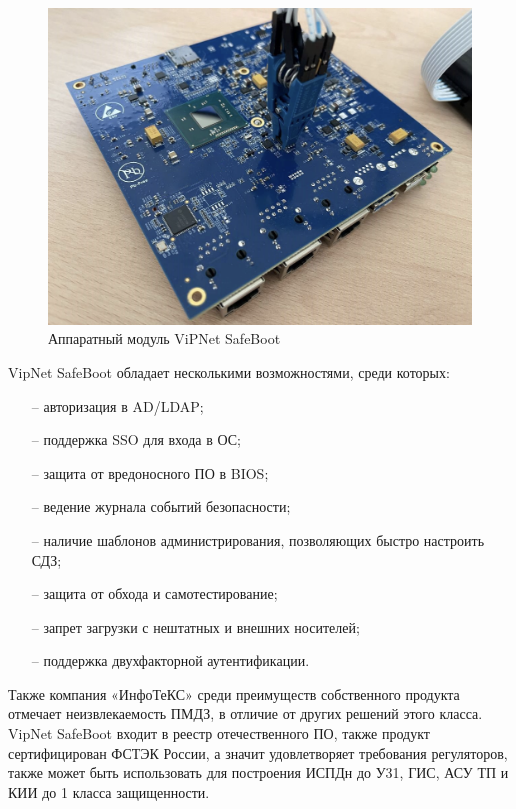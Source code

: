 \begin{figure}[H]
  \centering
  \includegraphics[width=1\textwidth]{pict/13}
  \caption{Аппаратный модуль ViPNet SafeBoot}
  \label{fig:62}
\end{figure}

VipNet SafeBoot обладает несколькими возможностями, среди которых:
\begin{itemize}
  \item [--] авторизация в AD/LDAP;
  \item [--] поддержка SSO для входа в ОС;
  \item [--] защита от вредоносного ПО в BIOS;
  \item [--] ведение журнала событий безопасности;
  \item [--] наличие шаблонов администрирования, позволяющих быстро настроить СДЗ;
  \item [--] защита от обхода и самотестирование;
  \item [--] запрет загрузки с нештатных и внешних носителей;
  \item [--] поддержка двухфакторной аутентификации.
\end{itemize}

Также компания «ИнфоТеКС» среди преимуществ собственного продукта отмечает неизвлекаемость ПМДЗ, 
в отличие от других решений этого класса. VipNet SafeBoot входит в реестр отечественного ПО,
также продукт сертифицирован ФСТЭК России, а значит удовлетворяет требования регуляторов, 
также может быть использовать для построения ИСПДн до У31, ГИС, АСУ ТП и КИИ до 1 класса 
защищенности.


